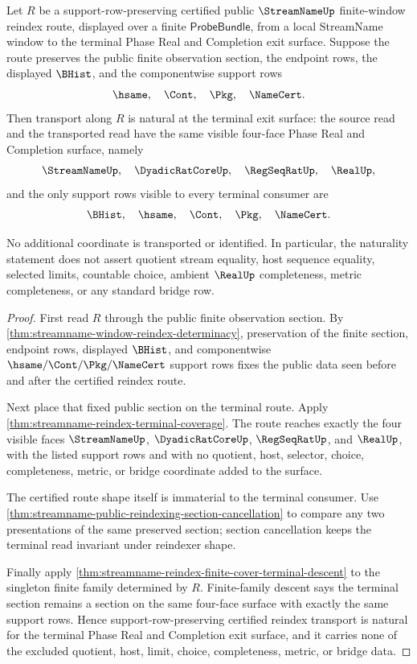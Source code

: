 \begin{theorem}
\label{thm:streamname-reindex-four-face-exit-naturality}
Let $R$ be a support-row-preserving certified public $\StreamNameUp$
finite-window reindex route, displayed over a finite
$\mathsf{ProbeBundle}$, from a local StreamName window to the terminal Phase
Real and Completion exit surface. Suppose the route preserves the public
finite observation section, the endpoint rows, the displayed $\BHist$, and the
componentwise support rows
$$
\hsame,\quad \Cont,\quad \Pkg,\quad \NameCert.
$$
Then transport along $R$ is natural at the terminal exit surface: the source
read and the transported read have the same visible four-face Phase Real and
Completion surface, namely
$$
\StreamNameUp,\quad \DyadicRatCoreUp,\quad \RegSeqRatUp,\quad \RealUp,
$$
and the only support rows visible to every terminal consumer are
$$
\BHist,\quad \hsame,\quad \Cont,\quad \Pkg,\quad \NameCert.
$$

No additional coordinate is transported or identified. In particular, the
naturality statement does not assert quotient stream equality, host sequence
equality, selected limits, countable choice, ambient $\RealUp$ completeness,
metric completeness, or any standard bridge row.
\end{theorem}
\begin{proof}
First read $R$ through the public finite observation section. By
\autoref{thm:streamname-window-reindex-determinacy}, preservation of the
finite section, endpoint rows, displayed $\BHist$, and componentwise
$\hsame/\Cont/\Pkg/\NameCert$ support rows fixes the public data seen before
and after the certified reindex route.

Next place that fixed public section on the terminal route. Apply
\autoref{thm:streamname-reindex-terminal-coverage}. The route reaches exactly
the four visible faces $\StreamNameUp$, $\DyadicRatCoreUp$, $\RegSeqRatUp$,
and $\RealUp$, with the listed support rows and with no quotient, host,
selector, choice, completeness, metric, or bridge coordinate added to the
surface.

The certified route shape itself is immaterial to the terminal consumer. Use
\autoref{thm:streamname-public-reindexing-section-cancellation} to compare
any two presentations of the same preserved section; section cancellation
keeps the terminal read invariant under reindexer shape.

Finally apply
\autoref{thm:streamname-reindex-finite-cover-terminal-descent} to the
singleton finite family determined by $R$. Finite-family descent says the
terminal section remains a section on the same four-face surface with exactly
the same support rows. Hence support-row-preserving certified reindex
transport is natural for the terminal Phase Real and Completion exit surface,
and it carries none of the excluded quotient, host, limit, choice,
completeness, metric, or bridge data.
\end{proof}


